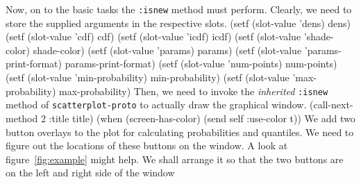 Now, on to the basic tasks the {\tt{}:isnew} method must perform. Clearly, we
need to store the supplied arguments in the respective slots.  
\nwenddocs{}\plusendmoddef
  (setf (slot-value 'dens) dens)
  (setf (slot-value 'cdf) cdf)
  (setf (slot-value 'icdf) icdf)
  (setf (slot-value 'shade-color) shade-color)
  (setf (slot-value 'params) params)
  (setf (slot-value 'params-print-format) params-print-format)
  (setf (slot-value 'num-points) num-points)
  (setf (slot-value 'min-probability) min-probability)
  (setf (slot-value 'max-probability) max-probability)
\nwendcode{}\nwdocspar
Then, we need to invoke the {\em inherited\/} {\tt{}:isnew} method of
{\tt{}scatterplot-proto} to actually draw the graphical window.
\nwenddocs{}\plusendmoddef
  (call-next-method 2 :title title)
  (when (screen-has-color) (send self :use-color t))
\nwendcode{}\nwdocspar
We add two button overlays to the plot for calculating
probabilities and quantiles. We need to figure out the
locations of these buttons on the window.  A look at 
figure~\ref{fig:example} might help. We shall arrange it so that the
two buttons are on the left and right side of the window
